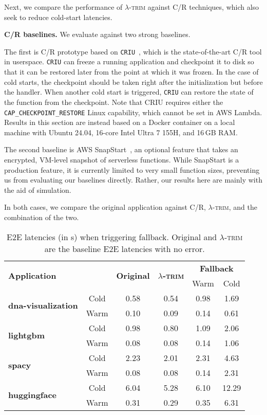 \documentclass[sigplan,screen]{acmart}
\newcommand{\sys}{\textsc{\ensuremath{\lambda}-trim}\xspace}
\newcommand{\heading}[1]{\vspace{4pt}\noindent\textbf{#1.}}
\newcommand{\application}[1]{{\textcolor{pennblue}{\textbf{#1}}}}
\begin{document}
Next, we compare the performance of \sys against C/R techniques, which also seek to reduce cold-start latencies.

\heading{C/R baselines}
We evaluate against two strong baselines.

The first is C/R prototype based on \texttt{CRIU}~\cite{criu}, which is the state-of-the-art C/R tool in userspace.
\texttt{CRIU} can freeze a running application and checkpoint it to disk so that it can be restored later from the point at which it was frozen.
In the case of cold starts, the checkpoint should be taken right after the initialization but before the handler.
When another cold start is triggered, \texttt{CRIU} can restore the state of the function from the checkpoint.
Note that CRIU requires either the \texttt{CAP\_CHECKPOINT\_RESTORE} Linux capability, which cannot be set in AWS Lambda.
Results in this section are instead based on a Docker container on a local machine with Ubuntu 24.04, 16-core Intel Ultra 7 155H, and 16\,GB RAM.




The second baseline is AWS SnapStart~\cite{snapstart}, an optional feature that takes an encrypted, VM-level snapshot of serverless functions.
While SnapStart is a production feature, it is currently limited to very small function sizes, preventing us from evaluating our baselines directly.
Rather, our results here are mainly with the aid of simulation.

In both cases, we compare the original application against C/R, \sys, and the combination of the two.



\begin{table}[t]
\scriptsize
\centering
\begin{tabularx}{\linewidth}{Xccc|cc}
\toprule
\multicolumn{2}{l}{\multirow{2}{*}{\textbf{Application}}} & \multirow{2}{*}{\textbf{Original}} & \multirow{2}{*}{\textbf{\boldmath \sys}} & \multicolumn{2}{c}{\textbf{Fallback}}  \\ 
& & & & Warm & Cold \\
\midrule
\multirow{2}{*}{\application{dna-visualization}} &Cold &0.58 &0.54 &0.98 &1.69 \\
&Warm &0.10 &0.09 &0.14 &0.61 \\ \midrule
\multirow{2}{*}{\application{lightgbm}} &Cold &0.98 &0.80 &1.09 &2.06 \\
&Warm &0.08 &0.08 &0.14 &1.06 \\ \midrule
\multirow{2}{*}{\application{spacy}} &Cold &2.23 &2.01 &2.31 &4.63 \\
&Warm &0.08 &0.08 &0.14 &2.31 \\ \midrule
\multirow{2}{*}{\application{huggingface}} &Cold &6.04 &5.28 &6.10 &12.29 \\
&Warm &0.31 &0.29 &0.35 &6.31 \\
\bottomrule
\end{tabularx}
\caption{E2E latencies (in s) when triggering fallback. Original and \sys are the baseline E2E latencies with no error.}
\label{tab:fallback-overhead}
\end{table}
\end{document}

